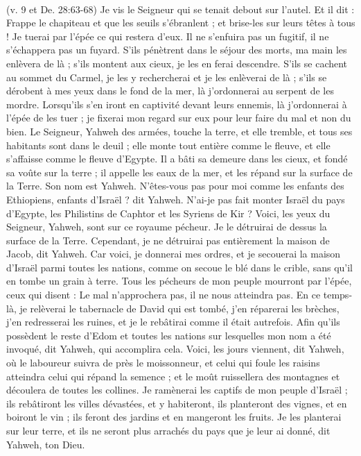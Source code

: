 \begin{multicols}{2}
{\\(v. 9 et De. 28:63-68)}
\VerseOne{}Je vis le Seigneur qui se tenait debout sur l'autel. Et il dit : Frappe le chapiteau et que les seuils s’ébranlent ; et brise-les sur leurs têtes à tous ! Je tuerai par l'épée ce qui restera d'eux. Il ne s’enfuira pas un fugitif, il ne s’échappera pas un fuyard.
S’ils pénètrent dans le séjour des morts, ma main les enlèvera de là ; s’ils montent aux cieux, je les en ferai descendre.
S’ils se cachent au sommet du Carmel, je les y rechercherai et je les enlèverai de là ; s’ils se dérobent à mes yeux dans le fond de la mer, là j’ordonnerai au serpent de les mordre.
Lorsqu'ils s'en iront en captivité devant leurs ennemis, là j’ordonnerai à l’épée de les tuer ; je fixerai mon regard sur eux pour leur faire du mal et non du bien.
Le Seigneur, Yahweh des armées, touche la terre, et elle tremble, et tous ses habitants sont dans le deuil ; elle monte tout entière comme le fleuve, et elle s’affaisse comme le fleuve d'Egypte.
Il a bâti sa demeure dans les cieux, et fondé sa voûte sur la terre ; il appelle les eaux de la mer, et les répand sur la surface de la Terre. Son nom est Yahweh.
N'êtes-vous pas pour moi comme les enfants des Ethiopiens, enfants d'Israël ? dit Yahweh. N'ai-je pas fait monter Israël du pays d'Egypte, les Philistins de Caphtor et les Syriens de Kir ?
Voici, les yeux du Seigneur, Yahweh, sont sur ce royaume pécheur. Je le détruirai de dessus la surface de la Terre. Cependant, je ne détruirai pas entièrement la maison de Jacob, dit Yahweh.
Car voici, je donnerai mes ordres, et je secouerai la maison d'Israël parmi toutes les nations, comme on secoue le blé dans le crible, sans qu'il en tombe un grain à terre.
Tous les pécheurs de mon peuple mourront par l'épée, ceux qui disent : Le mal n'approchera pas, il ne nous atteindra pas.
En ce temps-là, je relèverai le tabernacle de David qui est tombé, j’en réparerai les brèches, j’en redresserai les ruines, et je le rebâtirai comme il était autrefois.
Afin qu'ils possèdent le reste d’Edom et toutes les nations sur lesquelles mon nom a été invoqué, dit Yahweh, qui accomplira cela.
Voici, les jours viennent, dit Yahweh, où le laboureur suivra de près le moissonneur, et celui qui foule les raisins atteindra celui qui répand la semence ; et le moût ruissellera des montagnes et découlera de toutes les collines.
Je ramènerai les captifs de mon peuple d'Israël ; ils rebâtiront les villes dévastées, et y habiteront, ils planteront des vignes, et en boiront le vin ; ils feront des jardins et en mangeront les fruits.
Je les planterai sur leur terre, et ils ne seront plus arrachés du pays que je leur ai donné, dit Yahweh, ton Dieu.
\PPE{}
\end{multicols}
